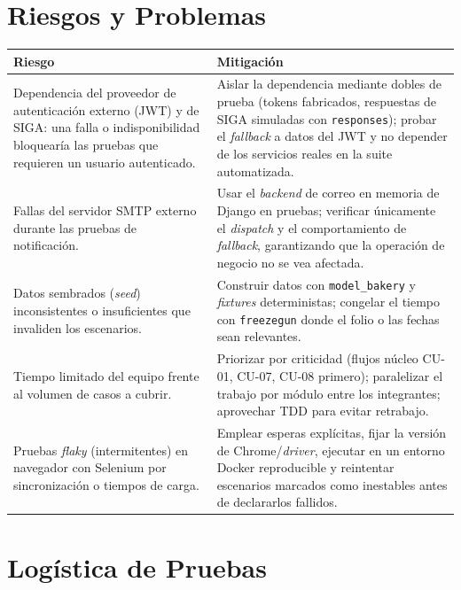 \documentclass[12pt,letterpaper]{report}
\begin{document}
\section{Riesgos y Problemas}

\begin{center}
\renewcommand{\arraystretch}{1.4}
\begin{tabularx}{\textwidth}{|L{5.6cm}|X|}
\hline
{}
\textbf{Riesgo} & \textbf{Mitigación} \\
\hline
Dependencia del proveedor de autenticación externo (JWT) y de SIGA: una falla o
indisponibilidad bloquearía las pruebas que requieren un usuario autenticado. &
Aislar la dependencia mediante dobles de prueba (tokens fabricados, respuestas
de SIGA simuladas con \texttt{responses}); probar el \emph{fallback} a datos del
JWT y no depender de los servicios reales en la suite automatizada. \\
\hline
Fallas del servidor SMTP externo durante las pruebas de notificación. & Usar el
\emph{backend} de correo en memoria de Django en pruebas; verificar únicamente
el \emph{dispatch} y el comportamiento de \emph{fallback}, garantizando que la
operación de negocio no se vea afectada. \\
\hline
Datos sembrados (\emph{seed}) inconsistentes o insuficientes que invaliden los
escenarios. & Construir datos con \texttt{model\_bakery} y \emph{fixtures}
deterministas; congelar el tiempo con \texttt{freezegun} donde el folio o las
fechas sean relevantes. \\
\hline
Tiempo limitado del equipo frente al volumen de casos a cubrir. & Priorizar por
criticidad (flujos núcleo CU-01, CU-07, CU-08 primero); paralelizar el trabajo
por módulo entre los integrantes; aprovechar TDD para evitar retrabajo. \\
\hline
Pruebas \emph{flaky} (intermitentes) en navegador con Selenium por
sincronización o tiempos de carga. & Emplear esperas explícitas, fijar la
versión de Chrome/\emph{driver}, ejecutar en un entorno Docker reproducible y
reintentar escenarios marcados como inestables antes de declararlos fallidos. \\
\hline
\end{tabularx}
\end{center}

\section{Logística de Pruebas}
\end{document}

